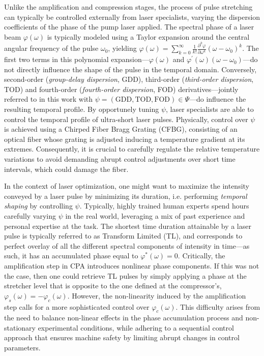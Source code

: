 Unlike the amplification and compression stages, the process of pulse stretching can typically be controlled externally from laser specialists, varying the dispersion coefficients of the phase of the pump laser applied. The spectral phase of a laser beam $\varphi(\omega)$ is typically modeled using a Taylor expansion around the central angular frequency of the pulse $\omega_0$, yielding $\varphi(\omega) = \sum_{k=0}^{\infty} \frac 1{k!}\frac{\partial^k \varphi}{\partial \omega^k} (\omega - \omega_0)^k$. The first two terms in this polynomial expansion---$\varphi(\omega)$ and $\varphi^\prime(\omega)(\omega - \omega_0)$---do not directly influence the shape of the pulse in the temporal domain. Conversely, second-order (\textit{group-delay dispersion}, GDD), third-order (\textit{third-order dispersion}, TOD) and fourth-order (\textit{fourth-order dispersion}, FOD) derivatives---jointly referred to in this work with $\psi = (\text{GDD}, \text{TOD}, \text{FOD}) \in \Psi$---do influence the resulting temporal profile. 
By opportunely tuning $\psi$, laser specialists are able to control the temporal profile of ultra-short laser pulses. Physically, control over $\psi$ is achieved using a Chirped Fiber Bragg Grating (CFBG), consisting of an optical fiber whose grating is adjusted inducing a temperature gradient at its extremes. Consequently, it is crucial to carefully regulate the relative temperature variations to avoid demanding abrupt control adjustments over short time intervals, which could damage the fiber.

In the context of laser optimization, one might want to maximize the intensity conveyed by a laser pulse by minimizing its duration, i.e. performing \textit{temporal shaping} by controlling $\psi$. Typically, highly trained human experts spend hours carefully varying $\psi$ in the real world, leveraging a mix of past experience and personal expertise at the task. The shortest time duration attainable by a laser pulse is typically referred to as Transform Limited (TL), and corresponds to perfect overlay of all the different spectral components of intensity in time---as such, it has an accumulated phase equal to $\varphi^*(\omega)=0$. Critically, the amplification step in CPA introduces nonlinear phase components. If this was not the case, then one could retrieve TL pulses by simply applying a phase at the stretcher level that is opposite to the one defined at the compressor's, $\varphi_s(\omega) = - \varphi_c(\omega)$. However, the non-linearity induced by the amplification step calls for a more sophisticated control over $\varphi_c(\omega)$. This difficulty arises from the need to balance non-linear effects in the phase accumulation process and non-stationary experimental conditions, while adhering to a sequential control approach that ensures machine safety by limiting abrupt changes in control parameters. 

